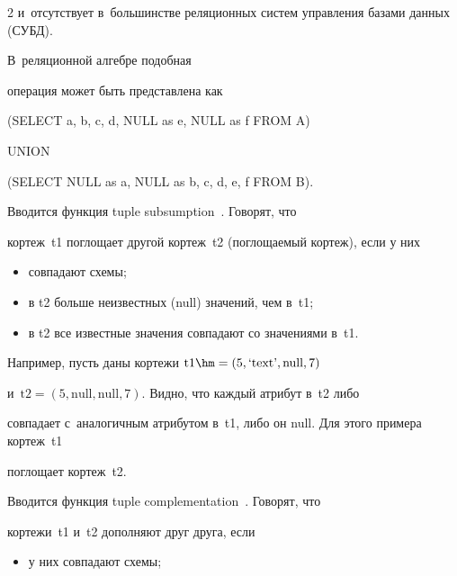 \begin{multicols}{2}
и~отсутствует в~большинстве реляционных систем управления базами данных (СУБД).

В~реляционной алгебре подобная

операция может быть представлена как



\smallskip



  \noindent

  ({\sf  SELECT a, b, c, d, NULL as e, NULL as f FROM A})



\noindent

  {\sf UNION}



\noindent

  ({\sf SELECT NULL as a, NULL as b, c, d, e, f FROM B}).



  Вводится функция {\sf tuple subsumption}~\cite{11-vov}. Говорят, что

кортеж~t1 поглощает другой кортеж~t2 (поглощаемый кортеж), если у них

  \begin{itemize}

\item совпадают схемы;

\item в t2 больше неизвестных (null) значений, чем в~t1;

\item в t2 все известные значения совпадают со значениями в~t1.

\end{itemize}



  Например, пусть даны кортежи $\mathrm{t1} \hm= (5, \mbox{`text'}, \mbox{null}, 7)$

и~$\mathrm{t2} = (5, \mathrm{null}, \mathrm{null}, 7)$. Видно, что каждый атрибут в~t2 либо

совпадает с~аналогичным атрибутом в~t1, либо он null. Для этого примера кортеж~t1

поглощает кортеж~t2.



  Вводится функция {\sf tuple complementation}~\cite{11-vov}. Говорят, что

кортежи~t1 и~t2 дополняют друг друга, если

  \begin{itemize}

\item у них совпадают схемы;


\end{itemize}
\end{multicols}

